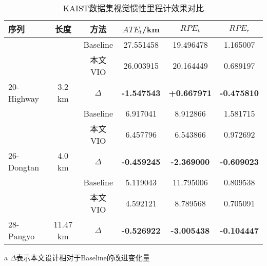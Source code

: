 \begin{table}
\centering
\begin{threeparttable}
\caption{KAIST数据集视觉惯性里程计效果对比}
\begin{tabular}{lccccc}
\toprule
序列                           & 长度                         & 方法         & $ATE_t$/km\textdownarrow{} & $RPE_t$\textdownarrow{}                           & $RPE_r$\textdownarrow{}  \\ \midrule
                              &                            & Baseline & 27.551458   & 19.496478                         & 1.165007 \\
                              &                            & 本文VIO      & 26.003915   & 20.164449                         & 0.689197 \\
\multirow{-3}{*}{20-Highway} & \multirow{-3}{*}{3.2 km}   & $\Delta$ & \cellcolor[HTML]{FFCCC9}\textbf{-1.547543}    & \cellcolor[HTML]{9AFF99}\textbf{+0.667971} & \cellcolor[HTML]{FFCCC9}\textbf{-0.475810} \\ \midrule
                              &                            & Baseline & 6.917041    & 8.912866                          & 1.581715 \\
                              &                            & 本文VIO      & 6.457796    & 6.543866                          & 0.972692 \\
\multirow{-3}{*}{26-Dongtan}   & \multirow{-3}{*}{4.0 km}   & $\Delta$ & \cellcolor[HTML]{FFCCC9}\textbf{-0.459245}    & \cellcolor[HTML]{FFCCC9}\textbf{-2.369000}                          & \cellcolor[HTML]{FFCCC9}\textbf{-0.609023} \\ \midrule
                              &                            & Baseline & 5.119043    & 11.795006                         & 0.809538 \\
                              &                            & 本文VIO      & 4.592121    & 8.789568                          & 0.705091 \\
\multirow{-3}{*}{28-Pangyo}   & \multirow{-3}{*}{11.47 km} & $\Delta$ & \cellcolor[HTML]{FFCCC9}\textbf{-0.526922}    & \cellcolor[HTML]{FFCCC9}\textbf{-3.005438}                          & \cellcolor[HTML]{FFCCC9}\textbf{-0.104447} \\ \bottomrule
\end{tabular}
\label{tab:vio_kaist}
\begin{tablenotes}
  \item [a] $\Delta$表示本文设计相对于Baseline的改进变化量
\end{tablenotes}
\end{threeparttable}
\end{table}

